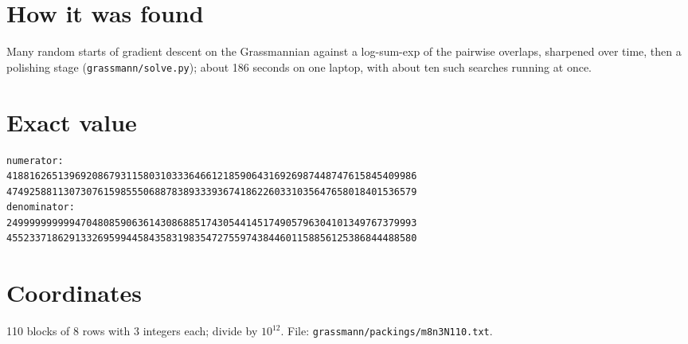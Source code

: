 \documentclass[11pt,a4paper]{article}
\begin{document}
\section{How it was found}
Many random starts of gradient descent on the Grassmannian against a log-sum-exp of the pairwise overlaps, sharpened over time, then a polishing stage (\texttt{grassmann/solve.py}); about 186 seconds on one laptop, with about ten such searches running at once.


\appendix
\section{Exact value}
{\small
\begin{verbatim}
numerator:
418816265139692086793115803103336466121859064316926987448747615845409986
474925881130730761598555068878389333936741862260331035647658018401536579
denominator:
249999999999470480859063614308688517430544145174905796304101349767379993
455233718629133269599445843583198354727559743844601158856125386844488580
\end{verbatim}}

\section{Coordinates}
110 blocks of 8 rows with 3 integers each; divide by $10^{12}$. File: \texttt{grassmann/packings/m8n3N110.txt}.
{\tiny
\begin{multicols}{3}
\end{multicols}}
\end{document}
